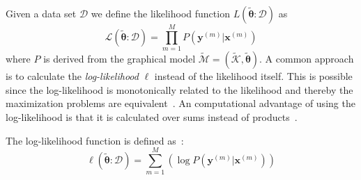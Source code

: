 \bigskip
Given a data set $\mathcal{D}$ we define the likelihood function $L(\mathbf{\tilde{\theta}}:\mathcal{D})$ as
\begin{equation}
  \label{equ:likelihood}
  \mathcal{L}\left(\mathbf{\tilde{\theta}}:\mathcal{D}\right)=\prod_{m=1}^M P\left(\mathbf{y}^{(m)}|\mathbf{x}^{(m)}\right)
\end{equation}
where $P$ is derived from the graphical model $\mathcal{\tilde{M}}=(\mathcal{\tilde{K}},\mathbf{\tilde{\theta}})$.
A common approach is to calculate the \textit{log-likelihood} $\ell$ instead of the likelihood itself.
This is possible since the log-likelihood is monotonically related to the likelihood and thereby the maximization problems are equivalent~\citep{koller2009probabilistic}.
An computational advantage of using the log-likelihood is that it is calculated over sums instead of products~\citep{koller2009probabilistic}.

The log-likelihood function is defined as~\citep{sutton2010introduction}:
\begin{equation}
  \label{equ:log-likelihood}
  \ell\left(\mathbf{\tilde{\theta}}:\mathcal{D}\right)=\sum_{m=1}^M \left(\log P\left(\mathbf{y}^{(m)}|\mathbf{x}^{(m)}\right)\right)
\end{equation}

